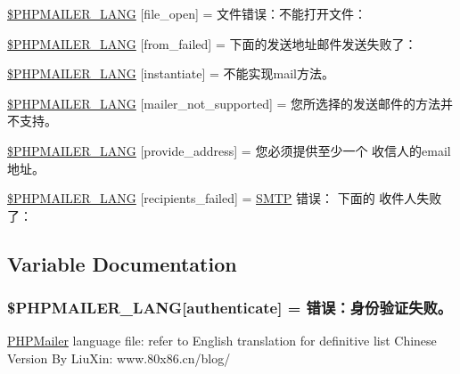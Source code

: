 \begin{DoxyCompactItemize}
\hyperlink{phpmailer_8lang-ch_8php_a28d1a6517bf4c942a0ddd506188ad2e0}{\$\+P\+H\+P\+M\+A\+I\+L\+E\+R\+\_\+\+L\+A\+NG} \mbox{[}\textquotesingle{}file\+\_\+open\textquotesingle{}\mbox{]} = \textquotesingle{}文件错误：不能打开文件：\textquotesingle{}
\item 
\hyperlink{phpmailer_8lang-ch_8php_adf832ae12155a09be077c6d5e4fd7e22}{\$\+P\+H\+P\+M\+A\+I\+L\+E\+R\+\_\+\+L\+A\+NG} \mbox{[}\textquotesingle{}from\+\_\+failed\textquotesingle{}\mbox{]} = \textquotesingle{}下面的发送地址邮件发送失败了： \textquotesingle{}
\item 
\hyperlink{phpmailer_8lang-ch_8php_ad58dde16780f4770ccf4dd282ea1f5ad}{\$\+P\+H\+P\+M\+A\+I\+L\+E\+R\+\_\+\+L\+A\+NG} \mbox{[}\textquotesingle{}instantiate\textquotesingle{}\mbox{]} = \textquotesingle{}不能实现mail方法。\textquotesingle{}
\item 
\hyperlink{phpmailer_8lang-ch_8php_aa2ebcb8833ee83a7ad67401c4bb3a6ad}{\$\+P\+H\+P\+M\+A\+I\+L\+E\+R\+\_\+\+L\+A\+NG} \mbox{[}\textquotesingle{}mailer\+\_\+not\+\_\+supported\textquotesingle{}\mbox{]} = \textquotesingle{} 您所选择的发送邮件的方法并不支持。\textquotesingle{}
\item 
\hyperlink{phpmailer_8lang-ch_8php_a8b97897c2406b7392b056f375feeefbb}{\$\+P\+H\+P\+M\+A\+I\+L\+E\+R\+\_\+\+L\+A\+NG} \mbox{[}\textquotesingle{}provide\+\_\+address\textquotesingle{}\mbox{]} = \textquotesingle{}您必须提供至少一个 收信人的email地址。\textquotesingle{}
\item 
\hyperlink{phpmailer_8lang-ch_8php_a7589d30bb9b368327c2df015f3e6bcba}{\$\+P\+H\+P\+M\+A\+I\+L\+E\+R\+\_\+\+L\+A\+NG} \mbox{[}\textquotesingle{}recipients\+\_\+failed\textquotesingle{}\mbox{]} = \textquotesingle{}\hyperlink{class_s_m_t_p}{S\+M\+TP} 错误： 下面的 收件人失败了： \textquotesingle{}
\end{DoxyCompactItemize}


\subsection{Variable Documentation}
\subsubsection[{\texorpdfstring{\$\+P\+H\+P\+M\+A\+I\+L\+E\+R\+\_\+\+L\+A\+NG}{$PHPMAILER_LANG}}]{\setlength{\rightskip}{0pt plus 5cm}\$P\+H\+P\+M\+A\+I\+L\+E\+R\+\_\+\+L\+A\+NG\mbox{[}\textquotesingle{}authenticate\textquotesingle{}\mbox{]} =  错误：身份验证失败。\textquotesingle{}}\hypertarget{phpmailer_8lang-ch_8php_a2cb33073c989b85580748e331ed8b4aa}{}\label{phpmailer_8lang-ch_8php_a2cb33073c989b85580748e331ed8b4aa}
\hyperlink{class_p_h_p_mailer}{P\+H\+P\+Mailer} language file\+: refer to English translation for definitive list Chinese Version By Liu\+Xin\+: www.\+80x86.\+cn/blog/ 

